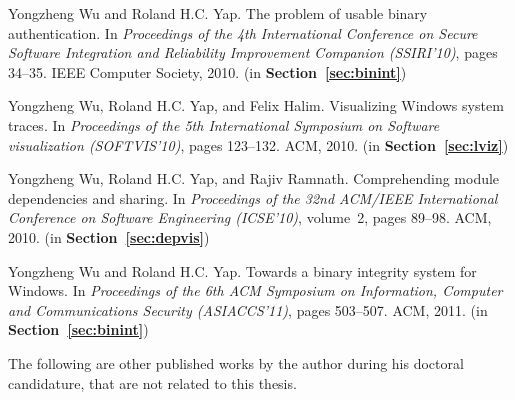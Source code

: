 \begin{tightenumerate}
\item
Yongzheng Wu and Roland H.C. Yap.
\newblock The problem of usable binary authentication.
\newblock In {\em Proceedings of the 4th International Conference on Secure
  Software Integration and Reliability Improvement Companion (SSIRI'10)}, pages 34--35.
  IEEE Computer Society, 2010.
\newblock (in {\bf Section~\ref{sec:binint}})

\item
Yongzheng Wu, Roland H.C. Yap, and Felix Halim.
\newblock Visualizing Windows system traces.
\newblock In {\em Proceedings of the 5th International Symposium on Software
  visualization (SOFTVIS'10)}, pages 123--132. ACM, 2010.
\newblock (in {\bf Section~\ref{sec:lviz}})

\item
Yongzheng Wu, Roland H.C. Yap, and Rajiv Ramnath.
\newblock Comprehending module dependencies and sharing.
\newblock In {\em Proceedings of the 32nd ACM/IEEE International Conference on
  Software Engineering (ICSE'10)}, volume~2, pages 89--98. ACM, 2010.
\newblock (in {\bf Section~\ref{sec:depvis}})

\item
Yongzheng Wu and Roland H.C. Yap.
\newblock Towards a binary integrity system for Windows.
\newblock In {\em Proceedings of the 6th ACM Symposium on Information, Computer
  and Communications Security (ASIACCS'11)},
  pages 503--507. ACM, 2011.
\newblock (in {\bf Section~\ref{sec:binint}})
\end{tightenumerate}

The following are other published works by the author during
his doctoral candidature, that are not related to this thesis.

